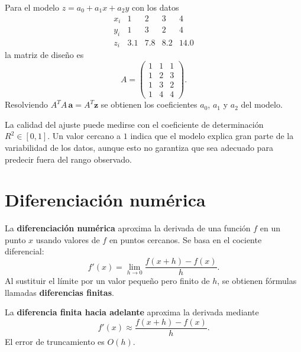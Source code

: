 \documentclass[a4,11pt]{aleph-notas}
\begin{document}
\begin{ejem}
    Para el modelo $z=a_0+a_1 x+a_2 y$ con los datos
    \[
        \begin{array}{c|cccc}
            x_i & 1 & 2 & 3 & 4\\
            \hline
            y_i & 1 & 3 & 2 & 4\\
            \hline
            z_i & 3.1 & 7.8 & 8.2 & 14.0
        \end{array}
    \]
    la matriz de diseño es
    \[
        A=
        \begin{pmatrix}
            1 & 1 & 1\\
            1 & 2 & 3\\
            1 & 3 & 2\\
            1 & 4 & 4
        \end{pmatrix}.
    \]
    Resolviendo $A^T A\,\mathbf{a}=A^T\mathbf{z}$ se obtienen los coeficientes $a_0$, $a_1$ y $a_2$ del modelo.
\end{ejem}

\begin{advertencia}
    La calidad del ajuste puede medirse con el coeficiente de determinación $R^2\in[0,1]$. Un valor cercano a $1$ indica que el modelo explica gran parte de la variabilidad de los datos, aunque esto no garantiza que sea adecuado para predecir fuera del rango observado.
\end{advertencia}


\section{Diferenciación numérica}

\begin{defi}
    La \textbf{diferenciación numérica} aproxima la derivada de una función $f$ en un punto $x$ usando valores de $f$ en puntos cercanos. Se basa en el cociente diferencial:
    \[
        f'(x) = \lim_{h\to 0}\frac{f(x+h)-f(x)}{h}.
    \]
    Al sustituir el límite por un valor pequeño pero finito de $h$, se obtienen fórmulas llamadas \textbf{diferencias finitas}.
\end{defi}

\begin{defi}
    La \textbf{diferencia finita hacia adelante} aproxima la derivada mediante
    \[
        f'(x)\approx\frac{f(x+h)-f(x)}{h}.
    \]
    El error de truncamiento es $O(h)$.
\end{defi}
\end{document}
